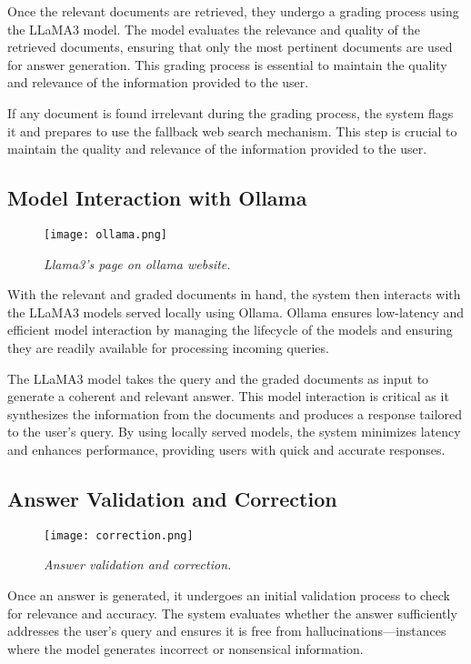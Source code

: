 Once the relevant documents are retrieved, they undergo a grading process using the LLaMA3 model. The model evaluates the relevance and quality of the retrieved documents, ensuring that only the most pertinent documents are used for answer generation. This grading process is essential to maintain the quality and relevance of the information provided to the user.

If any document is found irrelevant during the grading process, the system flags it and prepares to use the fallback web search mechanism. This step is crucial to maintain the quality and relevance of the information provided to the user.

\subsection{Model Interaction with Ollama}

\begin{figure}[H]
    \centering
    \texttt{[image: ollama.png]}
    \caption{
        \it{Llama3's page on ollama website.}
    }
\end{figure}

With the relevant and graded documents in hand, the system then interacts with the LLaMA3 models served locally using Ollama. Ollama ensures low-latency and efficient model interaction by managing the lifecycle of the models and ensuring they are readily available for processing incoming queries.

The LLaMA3 model takes the query and the graded documents as input to generate a coherent and relevant answer. This model interaction is critical as it synthesizes the information from the documents and produces a response tailored to the user's query. By using locally served models, the system minimizes latency and enhances performance, providing users with quick and accurate responses.

\subsection{Answer Validation and Correction}

\begin{figure}[H]
    \centering
    \texttt{[image: correction.png]}
    \caption{
        \it{Answer validation and correction.}
    }
\end{figure}

Once an answer is generated, it undergoes an initial validation process to check for relevance and accuracy. The system evaluates whether the answer sufficiently addresses the user's query and ensures it is free from hallucinations—instances where the model generates incorrect or nonsensical information.

